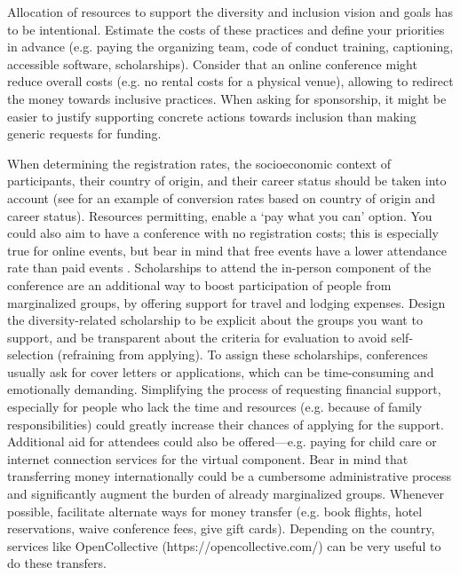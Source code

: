 \documentclass[10pt,letterpaper]{article}
\begin{document}
Allocation of resources to support the diversity and inclusion vision and goals has to be intentional. 
Estimate the costs of these practices and define your priorities in advance (e.g. paying the organizing team, code of conduct training, captioning, accessible software, scholarships).
Consider that an online conference might reduce overall costs (e.g. no rental costs for a physical venue), allowing to redirect the money towards inclusive practices. 
When asking for sponsorship, it might be easier to justify supporting concrete actions towards inclusion than making generic requests for funding.

When determining the registration rates, the socioeconomic context of participants, their country of origin, and their career status should be taken into account  \cite{sarabipourChangingScientificMeetings2021, andalibPostdocQueueLabour2018, kaplanPostdocNot2012}
(see \cite{canelon2021cost} for an example of conversion rates based on country of origin and career status). 
Resources permitting, enable a `pay what you can' option. You could also aim to have a conference with no registration costs; this is especially true for online events, but bear in mind that free events have a lower attendance rate than paid events \cite{eventbrite_ultimate_2017}. 
Scholarships to attend the in-person component of the conference are an additional way to boost participation of people from marginalized groups, by offering support for travel and lodging expenses.
Design the diversity-related scholarship to be explicit about the groups you want to support, and be transparent about the criteria for evaluation to avoid self-selection (refraining from applying). 
To assign these scholarships, conferences usually ask for cover letters or applications, which can be time-consuming and emotionally demanding. 
Simplifying the process of requesting financial support, especially for 
people who lack the time and resources (e.g. because of family responsibilities) could greatly increase their chances of applying for the support. 
Additional aid for attendees could also be offered—e.g. paying for child care or internet connection services for the virtual component. 
Bear in mind that transferring money internationally could be a cumbersome administrative process and significantly augment the burden of already marginalized groups. Whenever possible, facilitate alternate ways for money transfer (e.g. book flights, hotel reservations, waive conference fees, give gift cards). Depending on the country, services like OpenCollective (https://opencollective.com/) can be very useful to do these transfers. 
\end{document}
